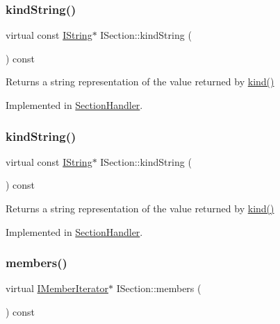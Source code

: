 \subsubsection{\texorpdfstring{kindString()}{kindString()}\hspace{0.1cm}{\footnotesize\ttfamily [1/2]}}
{\footnotesize\ttfamily virtual const \mbox{\hyperlink{class_i_string}{I\+String}}$\ast$ I\+Section\+::kind\+String (\begin{DoxyParamCaption}{ }\end{DoxyParamCaption}) const\hspace{0.3cm}{\ttfamily [pure virtual]}}

Returns a string representation of the value returned by \mbox{\hyperlink{class_i_section_a3610cc0bc9b90608ade62b84a750ddb4}{kind()}} 

Implemented in \mbox{\hyperlink{class_section_handler_a6f0ce72df9dc0d56ba8b20fb6684fdc9}{Section\+Handler}}.

\mbox{\label{class_i_section_ad4027ec4d324a2ee4987f3216e225fdb}} 
\subsubsection{\texorpdfstring{kindString()}{kindString()}\hspace{0.1cm}{\footnotesize\ttfamily [2/2]}}
{\footnotesize\ttfamily virtual const \mbox{\hyperlink{class_i_string}{I\+String}}$\ast$ I\+Section\+::kind\+String (\begin{DoxyParamCaption}{ }\end{DoxyParamCaption}) const\hspace{0.3cm}{\ttfamily [pure virtual]}}

Returns a string representation of the value returned by \mbox{\hyperlink{class_i_section_a3610cc0bc9b90608ade62b84a750ddb4}{kind()}} 

Implemented in \mbox{\hyperlink{class_section_handler_a6f0ce72df9dc0d56ba8b20fb6684fdc9}{Section\+Handler}}.

\mbox{\label{class_i_section_a1980a8501eb0adbc12f00e251210c39e}} 
\subsubsection{\texorpdfstring{members()}{members()}\hspace{0.1cm}{\footnotesize\ttfamily [1/2]}}
{\footnotesize\ttfamily virtual \mbox{\hyperlink{class_i_member_iterator}{I\+Member\+Iterator}}$\ast$ I\+Section\+::members (\begin{DoxyParamCaption}{ }\end{DoxyParamCaption}) const\hspace{0.3cm}{\ttfamily [pure virtual]}}

